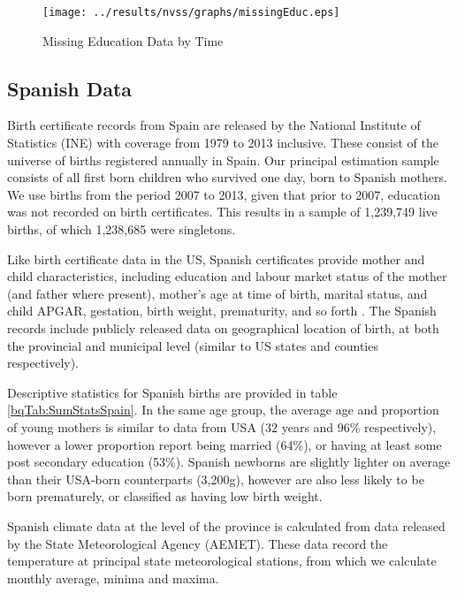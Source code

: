\documentclass[a4paper, 12 pt]{article}
\theoremstyle{plain}
\begin{document}
\begin{doublespace}
\begin{figure}[htpb!]
\caption{Missing Education Data by Time}
\label{bqFig:educMissing}
\texttt{[image: ../results/nvss/graphs/missingEduc.eps]}
\end{figure}
%


\subsection{Spanish Data}

Birth certificate records from Spain are released by the National Institute of Statistics (INE)
with coverage from 1979 to 2013 inclusive. These consist of the universe of
births registered annually in Spain. Our principal estimation sample consists of
all first born children who survived one day, born to Spanish mothers. We use
births from the period 2007 to 2013, given that prior to 2007, education was not
recorded on birth certificates.  This results in a sample of 1,239,749 live
births, of which 1,238,685 were singletons.

Like birth certificate data in the US, Spanish certificates provide mother
and child characteristics, including education and labour market status of the
mother (and father where present), mother's age at time of birth, marital
status, and child APGAR, gestation, birth weight, prematurity, and so forth
\citep{INE2013}.  The Spanish records include publicly released data on
geographical location of birth, at both the provincial and municipal level
(similar to US states and counties respectively).

Descriptive statistics for Spanish births are provided in table \ref{bqTab:SumStatsSpain}.  In the same
age group, the average age and proportion of young mothers is similar to data
from USA (32 years and 96\% respectively), however a lower proportion report
being married (64\%), or having at least some post secondary education (53\%).
Spanish newborns are slightly lighter on average than their USA-born
counterparts (3,200g), however are also less likely to be born prematurely,
or classified as having low birth weight.

Spanish climate data at the level of the province is calculated from data released by the State Meteorological
Agency (AEMET). These data record the temperature at principal state
meteorological stations, from which we calculate monthly average, minima and
maxima.




\end{doublespace}
\end{document}
